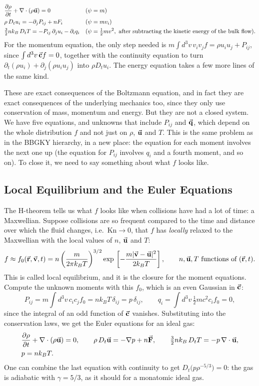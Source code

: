 \begin{align}
&\pdv{\rho}{t}+\nabla\cdot(\rho\va u)=0 &&(\psi=m)\\
&\rho\,D_tu_i=-\partial_jP_{ij}+nF_i &&(\psi=mv_i)\\
&\tfrac32 nk_B\,D_tT=-P_{ij}\,\partial_ju_i-\partial_iq_i &&(\psi=\tfrac12mv^2,\ \text{after subtracting the kinetic energy of the bulk flow}).
\end{align}
For the momentum equation, the only step needed is $m\int d^3v\,v_iv_jf=\rho u_iu_j+P_{ij}$, since $\int d^3v\,\va c f=0$, together with the continuity equation to turn $\partial_t(\rho u_i)+\partial_j(\rho u_iu_j)$ into $\rho D_tu_i$. The energy equation takes a few more lines of the same kind.

These are exact consequences of the Boltzmann equation, and in fact they are exact consequences of the underlying mechanics too, since they only use conservation of mass, momentum and energy. But they are not a closed system. We have five equations, and unknowns that include $P_{ij}$ and $\va q$, which depend on the whole distribution $f$ and not just on $\rho$, $\va u$ and $T$. This is the same problem as in the BBGKY hierarchy, in a new place: the equation for each moment involves the next one up (the equation for $P_{ij}$ involves $q_i$ and a fourth moment, and so on). To close it, we need to say something about what $f$ looks like.

\subsection{Local Equilibrium and the Euler Equations}

The H-theorem tells us what $f$ looks like when collisions have had a lot of time: a Maxwellian. Suppose collisions are so frequent compared to the time and distance over which the fluid changes, i.e.\ $\mathrm{Kn}\to0$, that $f$ has \emph{locally} relaxed to the Maxwellian with the local values of $n$, $\va u$ and $T$:
\[
f\approx f_0(\va r,\va v,t)=n\left(\frac{m}{2\pi k_BT}\right)^{3/2}\exp\, \left[-\frac{m|\va v-\va u|^2}{2k_BT}\right],\qquad n,\va u,T\ \text{functions of }(\va r,t).
\]
This is called local equilibrium, and it is the closure for the moment equations. Compute the unknown moments with this $f_0$, which is an even Gaussian in $\va c$:
\[
P_{ij}=m\int d^3v\,c_ic_jf_0=nk_BT\,\delta_{ij}=p\,\delta_{ij},\qquad q_i=\int d^3v\,\tfrac12mc^2c_if_0=0 ,
\]
since the integral of an odd function of $\va c$ vanishes. Substituting into the conservation laws, we get the Euler equations for an ideal gas:
\begin{align*}
&\pdv{\rho}{t}+\nabla\cdot(\rho\va u)=0, \qquad \rho\,D_t\va u=-\nabla p+n\va F, \qquad \tfrac32nk_B\,D_tT=-p\,\nabla\cdot\va u,\\
&p=nk_BT.
\end{align*}
One can combine the last equation with continuity to get $D_t\big(p\rho^{-5/3}\big)=0$: the gas is adiabatic with $\gamma=5/3$, as it should for a monatomic ideal gas.

